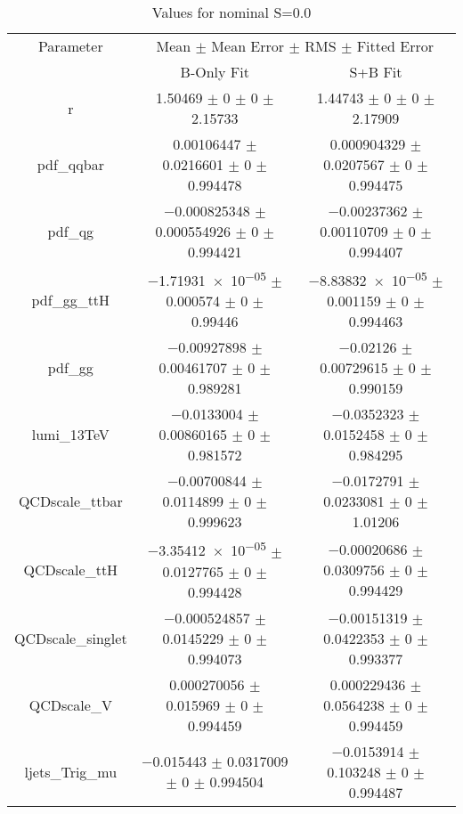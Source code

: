 \begin{table}
\centering
\caption{Values for nominal S=0.0}
\begin{tabular}{ccc}
\toprule
Parameter & \multicolumn{2}{c}{Mean $\pm$ Mean Error $\pm$ RMS $\pm$ Fitted Error}\\
 & B-Only Fit & S+B Fit\\
\midrule
r & \num{1.50469} $\pm$ \num{0} $\pm$ \num{0} $\pm$ \num{2.15733} & \num{1.44743} $\pm$ \num{0} $\pm$ \num{0} $\pm$ \num{2.17909}\\
pdf\_qqbar & \num{0.00106447} $\pm$ \num{0.0216601} $\pm$ \num{0} $\pm$ \num{0.994478} & \num{0.000904329} $\pm$ \num{0.0207567} $\pm$ \num{0} $\pm$ \num{0.994475}\\
pdf\_qg & \num{-0.000825348} $\pm$ \num{0.000554926} $\pm$ \num{0} $\pm$ \num{0.994421} & \num{-0.00237362} $\pm$ \num{0.00110709} $\pm$ \num{0} $\pm$ \num{0.994407}\\
pdf\_gg\_ttH & \num{-1.71931e-05} $\pm$ \num{0.000574} $\pm$ \num{0} $\pm$ \num{0.99446} & \num{-8.83832e-05} $\pm$ \num{0.001159} $\pm$ \num{0} $\pm$ \num{0.994463}\\
pdf\_gg & \num{-0.00927898} $\pm$ \num{0.00461707} $\pm$ \num{0} $\pm$ \num{0.989281} & \num{-0.02126} $\pm$ \num{0.00729615} $\pm$ \num{0} $\pm$ \num{0.990159}\\
lumi\_13TeV & \num{-0.0133004} $\pm$ \num{0.00860165} $\pm$ \num{0} $\pm$ \num{0.981572} & \num{-0.0352323} $\pm$ \num{0.0152458} $\pm$ \num{0} $\pm$ \num{0.984295}\\
QCDscale\_ttbar & \num{-0.00700844} $\pm$ \num{0.0114899} $\pm$ \num{0} $\pm$ \num{0.999623} & \num{-0.0172791} $\pm$ \num{0.0233081} $\pm$ \num{0} $\pm$ \num{1.01206}\\
QCDscale\_ttH & \num{-3.35412e-05} $\pm$ \num{0.0127765} $\pm$ \num{0} $\pm$ \num{0.994428} & \num{-0.00020686} $\pm$ \num{0.0309756} $\pm$ \num{0} $\pm$ \num{0.994429}\\
QCDscale\_singlet & \num{-0.000524857} $\pm$ \num{0.0145229} $\pm$ \num{0} $\pm$ \num{0.994073} & \num{-0.00151319} $\pm$ \num{0.0422353} $\pm$ \num{0} $\pm$ \num{0.993377}\\
QCDscale\_V & \num{0.000270056} $\pm$ \num{0.015969} $\pm$ \num{0} $\pm$ \num{0.994459} & \num{0.000229436} $\pm$ \num{0.0564238} $\pm$ \num{0} $\pm$ \num{0.994459}\\
ljets\_Trig\_mu & \num{-0.015443} $\pm$ \num{0.0317009} $\pm$ \num{0} $\pm$ \num{0.994504} & \num{-0.0153914} $\pm$ \num{0.103248} $\pm$ \num{0} $\pm$ \num{0.994487}\\

\end{tabular}
\end{table}
